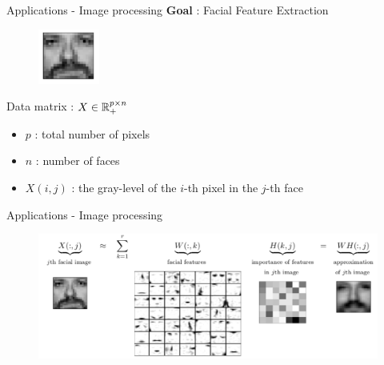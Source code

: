 \begin{frame}{Applications - Image processing}
    \textbf{Goal} : Facial Feature Extraction\\
    \begin{figure}
        \centering
        \includegraphics[width=2cm]{face_image.png}
    \end{figure}
    Data matrix : $X\in\mathbb{R}^{p\times n}_+$\\
    \begin{itemize}
        \item $p$ : total number of pixels
        \item $n$ : number of faces
        \item $X(i,j)$ : the gray-level of the $i$-th pixel in the $j$-th face
    \end{itemize}
\end{frame}
    
\begin{frame}{Applications - Image processing}
    \begin{figure}
        \centering
        \includegraphics[width=\linewidth]{NMF_app1.png}
    \end{figure}
\end{frame}

